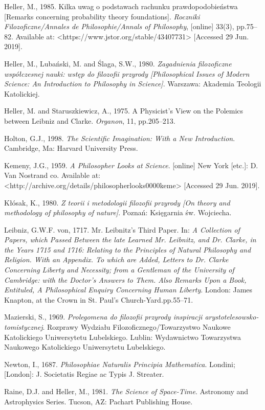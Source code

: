 \documentclass[a4paper]{article}
\begin{document}
Heller, M., 1985. Kilka uwag o podstawach rachunku prawdopodobieństwa [Remarks concerning probability theory
foundations]. \textit{Roczniki Filozoficzne/Annales de Philosophie/Annals of Philosophy}, [online] 33(3), pp.75–82.
Available at: {\textless}https://www.jstor.org/stable/43407731{\textgreater} [Accessed 29 Jun. 2019].

Heller, M., Lubański, M. and Ślaga, S.W., 1980. \textit{Zagadnienia filozoficzne współczesnej nauki: wstęp do filozofii
przyrody [Philosophical Issues of Modern Science: An Introduction to Philosophy in Science]}. Warszawa: Akademia
Teologii Katolickiej.

Heller, M. and Staruszkiewicz, A., 1975. A Physicist’s View on the Polemics between Leibniz and Clarke.
\textit{Organon}, 11, pp.205–213.

Holton, G.J., 1998. \textit{The Scientific Imagination: With a New Introduction}. Cambridge, Ma: Harvard University
Press.

Kemeny, J.G., 1959. \textit{A Philosopher Looks at Science}. [online] New York [etc.]: D. Van Nostrand co. Available at:
{\textless}http://archive.org/details/philosopherlooks0000keme{\textgreater} [Accessed 29 Jun. 2019].

Kłósak, K., 1980. \textit{Z teorii i metodologii filozofii przyrody [On theory and methodology of philosophy of
nature]}. Poznań: Księgarnia św. Wojciecha.

Leibniz, G.W.F. von, 1717. Mr. Leibnitz’s Third Paper. In: \textit{A Collection of Papers, which Passed Between the late
Learned Mr. Leibnitz, and Dr. Clarke, in the Years 1715 and 1716: Relating to the Principles of Natural Philosophy and
Religion. With an Appendix. To which are Added, Letters to Dr. Clarke Concerning Liberty and Necessity; from a
Gentleman of the University of Cambridge: with the Doctor’s Answers to Them. Also Remarks Upon a Book, Entituled, A
Philosophical Enquiry Concerning Human Liberty}. London: James Knapton, at the Crown in St. Paul’s
Church-Yard.pp.55–71.

Mazierski, S., 1969. \textit{Prolegomena do filozofii przyrody inspiracji arystotelesowsko-tomistycznej}. Rozprawy
Wydziału Filozoficznego/Towarzystwo Naukowe Katolickiego Uniwersytetu Lubelskiego. Lublin: Wydawnictwo Towarzystwa
Naukowego Katolickiego Uniwersytetu Lubelskiego.

Newton, I., 1687. \textit{Philosophiae Naturalis Principia Mathematica}. Londini; [London]: J. Societatis Regiae ac
Typis J. Streater.

Raine, D.J. and Heller, M., 1981. \textit{The Science of Space-Time}. Astronomy and Astrophysics Series. Tucson, AZ:
Pachart Publishing House.
\end{document}
